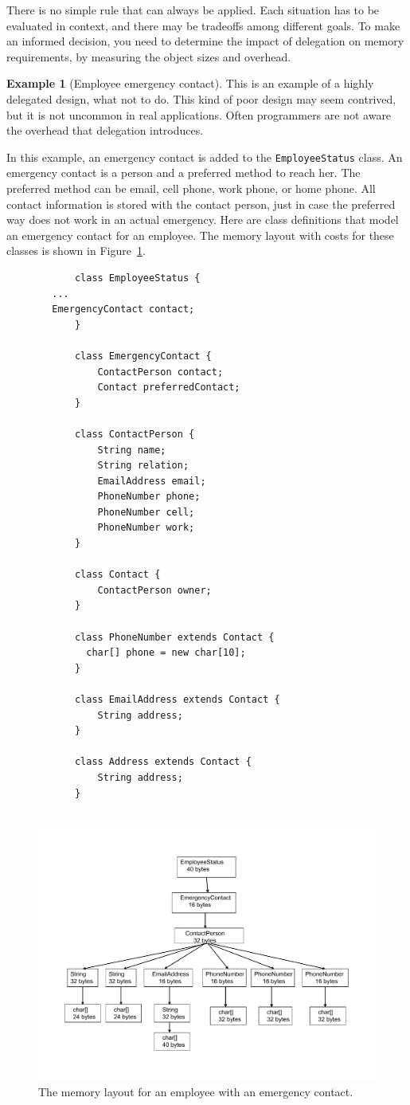 \documentclass{book}
\theoremstyle{definition}
\newtheorem{example}{Example}
\begin{document}
There is no simple rule that can always be applied. Each situation has to be evaluated in context, and there may be tradeoffs among different goals. To make an informed decision, you need to determine the impact of delegation on memory requirements, by measuring the object sizes and overhead.  

 
\begin{example}[Employee emergency contact] 
This is an example of a highly delegated design, what not to do. This kind of poor design may seem contrived, but it is not uncommon in real applications. Often programmers are not aware the overhead that delegation introduces.

In this example, an emergency contact is added to the \texttt{EmployeeStatus} class. An emergency contact is a person and a preferred method to reach her.  The preferred method can be email, cell phone, work phone, or home phone. All contact information is stored with the contact person, just in case the preferred way does not work in an actual emergency. Here are class definitions that model an emergency contact for an employee. The memory layout with costs for these classes is shown in Figure~\ref{fig:employee-status-fine-grained}.
\ttfamily
\begin{verbatim} 
			class EmployeeStatus {
        ...
        EmergencyContact contact;
			}
			
			class EmergencyContact {
				ContactPerson contact;
				Contact preferredContact;
			}
			
			class ContactPerson {
				String name;
				String relation;
				EmailAddress email;
				PhoneNumber phone;
				PhoneNumber cell;
				PhoneNumber work;
			}
			
			class Contact {
				ContactPerson owner;
			}
			
			class PhoneNumber extends Contact {
			  char[] phone = new char[10];
			}
			
			class EmailAddress extends Contact {
				String address;
			}
			
			class Address extends Contact {
				String address;
			}
			
\end{verbatim}
\normalfont
 \begin{figure}
  \centering
 \includegraphics[width=.70\textwidth]{Figures/chapter4/employee-status-fine-grained.pdf}
  \caption{The memory layout for an employee with an emergency contact.}
  \label{fig:employee-status-fine-grained}
\end{figure}


\end{example}
\end{document}

